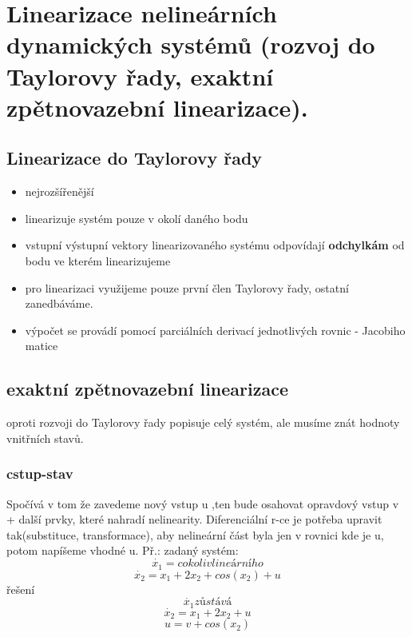 \section{Linearizace nelineárních dynamických systémů (rozvoj do Taylorovy řady, exaktní zpětnovazební
  linearizace).
 }

\subsection{Linearizace do Taylorovy řady}
\begin{itemize}
    \item nejrozšířenější
    \item linearizuje systém pouze v okolí daného bodu
    \item vstupní výstupní vektory linearizovaného systému odpovídají { \bf odchylkám} od bodu ve kterém linearizujeme
    \item pro linearizaci využijeme pouze první člen Taylorovy řady, ostatní zanedbáváme.
    \item výpočet se provádí pomocí parciálních derivací jednotlivých rovnic - Jacobiho matice
\end{itemize}

\subsection{exaktní zpětnovazební linearizace}
oproti rozvoji do Taylorovy řady popisuje celý systém, ale musíme znát hodnoty vnitřních stavů.
\subsubsection{cstup-stav}
Spočívá v tom že zavedeme nový vstup u ,ten bude osahovat opravdový vstup v + další prvky, které nahradí nelinearity.
Diferenciální r-ce je potřeba upravit tak(substituce, transformace), aby nelineární část byla jen v rovnici kde je u, potom napíšeme vhodné u.
Př.:
zadaný systém:
\begin{equation}
    \dot{x_1}=cokoliv lineárního
\end{equation}
\begin{equation*}
    \dot{x_2}=x_1+2x_2+cos(x_2)+u
\end{equation*}
řešení
\begin{equation*}
    \dot{x_1}  zůstává
\end{equation*}
\begin{equation}
    \dot{x_2}=x_1+2x_2+u
\end{equation}
\begin{equation*}
    u=v+cos(x_2)
\end{equation*}

